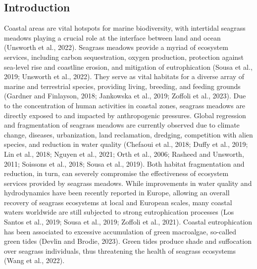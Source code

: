 \documentclass[
  letterpaper,
  11pt,
  english,
  singlespacing,
  headsepline]{MastersDoctoralThesis}
\newcommand{\startonrightwithgap}{%
  \clearpage
  \ifodd\value{page}
    \thispagestyle{empty}\mbox{}\clearpage
    \thispagestyle{empty}\mbox{}\clearpage
  \else
    \thispagestyle{empty}\mbox{}\clearpage
  \fi
}
\begin{document}
\begin{spacing}{1.5}
\startonrightwithgap

\section{Introduction}\label{introduction-2}

Coastal areas are vital hotspots for marine biodiversity, with
intertidal seagrass meadows playing a crucial role at the interface
between land and ocean (Unsworth et al., 2022). Seagrass meadows provide
a myriad of ecosystem services, including carbon sequestration, oxygen
production, protection against sea-level rise and coastline erosion, and
mitigation of eutrophication (Sousa et al., 2019; Unsworth et al.,
2022). They serve as vital habitats for a diverse array of marine and
terrestrial species, providing living, breeding, and feeding grounds
(Gardner and Finlayson, 2018; Jankowska et al., 2019; Zoffoli et al.,
2023). Due to the concentration of human activities in coastal zones,
seagrass meadows are directly exposed to and impacted by anthropogenic
pressures. Global regression and fragmentation of seagrass meadows are
currently observed due to climate change, diseases, urbanization, land
reclamation, dredging, competition with alien species, and reduction in
water quality (Chefaoui et al., 2018; Duffy et al., 2019; Lin et al.,
2018; Nguyen et al., 2021; Orth et al., 2006; Rasheed and Unsworth,
2011; Soissons et al., 2018; Sousa et al., 2019). Both habitat
fragmentation and reduction, in turn, can severely compromise the
effectiveness of ecosystem services provided by seagrass meadows. While
improvements in water quality and hydrodynamics have been recently
reported in Europe, allowing an overall recovery of seagrass ecosystems
at local and European scales, many coastal waters worldwide are still
subjected to strong eutrophication processes (Los Santos et al., 2019;
Sousa et al., 2019; Zoffoli et al., 2021). Coastal eutrophication has
been associated to excessive accumulation of green macroalgae, so-called
green tides (Devlin and Brodie, 2023). Green tides produce shade and
suffocation over seagrass individuals, thus threatening the health of
seagrass ecosystems (Wang et al., 2022).


\end{spacing}
\end{document}
